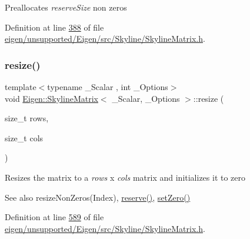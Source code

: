 Preallocates {\itshape reserve\+Size} non zeros 

Definition at line \hyperlink{eigen_2unsupported_2_eigen_2src_2_skyline_2_skyline_matrix_8h_source_l00388}{388} of file \hyperlink{eigen_2unsupported_2_eigen_2src_2_skyline_2_skyline_matrix_8h_source}{eigen/unsupported/\+Eigen/src/\+Skyline/\+Skyline\+Matrix.\+h}.

\mbox{\label{class_eigen_1_1_skyline_matrix_a918eed5cc583f6d402f0db60c5c5ad52}} 
\subsubsection{\texorpdfstring{resize()}{resize()}\hspace{0.1cm}{\footnotesize\ttfamily [1/2]}}
{\footnotesize\ttfamily template$<$typename \+\_\+\+Scalar , int \+\_\+\+Options$>$ \\
void \hyperlink{class_eigen_1_1_skyline_matrix}{Eigen\+::\+Skyline\+Matrix}$<$ \+\_\+\+Scalar, \+\_\+\+Options $>$\+::resize (\begin{DoxyParamCaption}\item[{size\+\_\+t}]{rows,  }\item[{size\+\_\+t}]{cols }\end{DoxyParamCaption})\hspace{0.3cm}{\ttfamily [inline]}}

Resizes the matrix to a {\itshape rows} x {\itshape cols} matrix and initializes it to zero \begin{DoxySeeAlso}{See also}
resize\+Non\+Zeros(\+Index), \hyperlink{class_eigen_1_1_skyline_matrix_aac6da20a87fca9d4cb6b871504497577}{reserve()}, \hyperlink{class_eigen_1_1_skyline_matrix_afeb349e5dc4b5d8c107ff067b44438f5}{set\+Zero()} 
\end{DoxySeeAlso}


Definition at line \hyperlink{eigen_2unsupported_2_eigen_2src_2_skyline_2_skyline_matrix_8h_source_l00589}{589} of file \hyperlink{eigen_2unsupported_2_eigen_2src_2_skyline_2_skyline_matrix_8h_source}{eigen/unsupported/\+Eigen/src/\+Skyline/\+Skyline\+Matrix.\+h}.

\mbox{\label{class_eigen_1_1_skyline_matrix_a918eed5cc583f6d402f0db60c5c5ad52}} 
